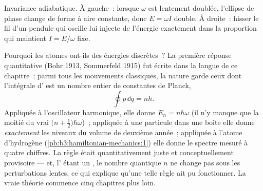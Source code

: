 \begin{omfigure}

{\small Invariance adiabatique. À gauche~: lorsque $\omega$ est
lentement doublée, l'ellipse de phase change de forme à aire constante,
donc $E = \omega I$ double. À droite~: hisser le fil d'un pendule qui
oscille lui injecte de l'énergie exactement dans la proportion qui
maintient $I = E/\omega$ fixe.}
\end{omfigure}

\begin{remark}\label{rem:b3:hamiltonian-mechanics:old-quantum}
Pourquoi les atomes ont-ils des énergies discrètes~? La première
réponse quantitative (Bohr 1913, Sommerfeld 1915) fut écrite dans la
langue de ce chapitre~: parmi tous les mouvements classiques, la nature
garde ceux dont l'intégrale d' est un nombre entier de constantes
de Planck,
\[
\oint p\,\dd q = nh .
\]
Appliquée à l'oscillateur harmonique, elle donne $E_n = n\hbar\omega$
(il n'y manque que la moitié du vrai $\big(n + \tfrac12\big)\hbar
\omega$)~; appliquée à une particule dans une boîte elle donne
\emph{exactement} les niveaux du volume de deuxième année~; appliquée à
l'atome d'hydrogène (\cref{pb:b3:hamiltonian-mechanics:1}) elle donne
le spectre mesuré à quatre chiffres. La règle était quantitativement
juste et conceptuellement provisoire --- et, l' étant un
, le nombre quantique $n$ ne change pas sous les
perturbations lentes, ce qui explique qu'une telle règle ait pu
fonctionner. La vraie théorie commence cinq chapitres plus loin.
\end{remark}

